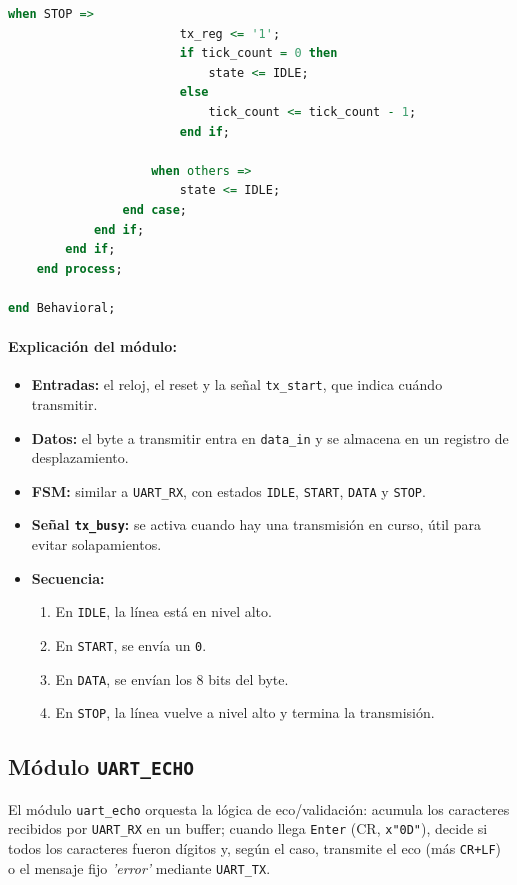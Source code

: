 \documentclass[a4paper,12pt]{article}
\begin{document}
\begin{lstlisting}[language=VHDL, caption={Código completo del módulo UART\_TX}, label={lst:uart_tx}]
                    when STOP =>
                        tx_reg <= '1';
                        if tick_count = 0 then
                            state <= IDLE;
                        else
                            tick_count <= tick_count - 1;
                        end if;

                    when others =>
                        state <= IDLE;
                end case;
            end if;
        end if;
    end process;

end Behavioral;
\end{lstlisting}

\paragraph{Explicación del módulo:}
\begin{itemize}
    \item \textbf{Entradas:} el reloj, el reset y la señal \texttt{tx\_start}, que indica cuándo transmitir.
    \item \textbf{Datos:} el byte a transmitir entra en \texttt{data\_in} y se almacena en un registro de desplazamiento.
    \item \textbf{FSM:} similar a \texttt{UART\_RX}, con estados \texttt{IDLE}, \texttt{START}, \texttt{DATA} y \texttt{STOP}.
    \item \textbf{Señal \texttt{tx\_busy}:} se activa cuando hay una transmisión en curso, útil para evitar solapamientos.
    \item \textbf{Secuencia:}
    \begin{enumerate}
        \item En \texttt{IDLE}, la línea está en nivel alto.
        \item En \texttt{START}, se envía un \texttt{0}.
        \item En \texttt{DATA}, se envían los 8 bits del byte.
        \item En \texttt{STOP}, la línea vuelve a nivel alto y termina la transmisión.
    \end{enumerate}
\end{itemize}

\subsection{Módulo \texttt{UART\_ECHO}}

El módulo \texttt{uart\_echo} orquesta la lógica de eco/validación: acumula los caracteres recibidos por \texttt{UART\_RX} en un buffer; cuando llega \texttt{Enter} (CR, \texttt{x"0D"}), decide si todos los caracteres fueron dígitos y, según el caso, transmite el eco (más \texttt{CR+LF}) o el mensaje fijo \textit{'error'} mediante \texttt{UART\_TX}.
\end{document}
